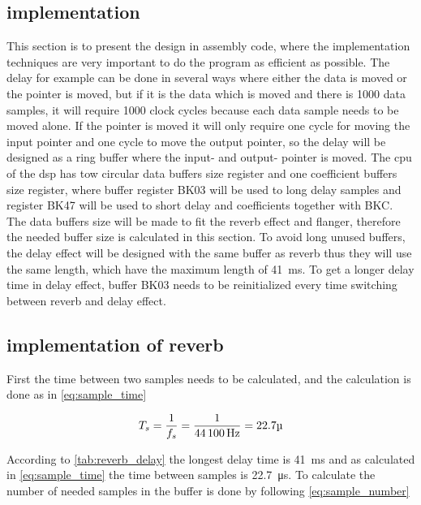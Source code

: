 \subsection{implementation}
This section is to present the design in assembly code, where the implementation techniques are very important to do the program as efficient as possible. The delay for example can be done in several ways where either the data is moved or the pointer is moved, but if it is the data which is moved and there is 1000 data samples, it will require 1000 clock cycles because each data sample needs to be moved alone. If the pointer is moved it will only require one cycle for moving the input pointer and one cycle to move the output pointer, so the delay will be designed as a ring buffer where the input- and output- pointer is moved. 
The \gls{cpu} of the \gls{dsp} has tow circular data buffers size register and one coefficient buffers size register, where buffer register BK03 will be used to long delay samples and register BK47 will be used to short delay and coefficients together with BKC. The data buffers size will be made to fit the \gls{reverb} effect and flanger, therefore the needed buffer size is calculated in this section. To avoid long unused buffers, the delay effect will be designed with the same buffer as \gls{reverb} thus they will use the same length, which have the maximum length of \SI{41}{\milli\second}. To get a longer delay time in delay effect, buffer BK03 needs to be reinitialized every time switching between \gls{reverb} and delay effect. 


\subsection{implementation of \gls{reverb}}
 First the time between two samples needs to be calculated, and the calculation is done as in \autoref{eq:sample_time}

    \begin{equation}\label{eq:sample_time}
T_s=\frac{1}{f_s} = \frac{1}{\SI{44100}{\hertz}} = 22.7\micro \addunit{\SI{}{\second}}
    \end{equation}

\startexplain
{}
    \stopexplain


According to \autoref{tab:reverb_delay} the longest delay time is \SI{41}{\milli\second} and as calculated in \autoref{eq:sample_time} the time between samples is \SI{22.7}{\micro\second}. To calculate the number of needed samples in the buffer is done by following \autoref{eq:sample_number}

